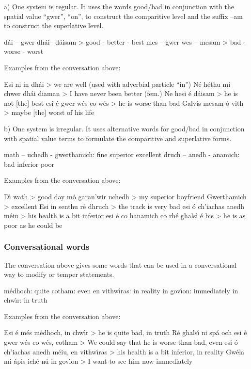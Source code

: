 a) One system is regular. It uses the words good/bad in conjunction with the spatial value “gwer”, “on”, to construct the comparitive level and the suffix –am to construct the superlative level.

        d\'{a}i – gwer dh\'{a}i– d\'{a}isam > good - better - best
        mes – gwer wes – mesam > bad - worse - worst

Examples from the conversation above:

Esi ni in dh\'{a}i > we are well (used with adverbial particle “in”)
N\'{e} h\'{e}thu mi chwer dh\'{a}i diaman > I have never been better (fem.)
Ne hesi \'{e} d\'{a}isam > he is not [the] best
esi \'{e} gwer w\'{e}s co w\'{e}s > he is worse than bad
Galvis mesam \'{o} vith > maybe [the] worst of his life

b) One system is irregular. It uses alternative words for good/bad in conjunction with spatial value terms to formulate the comparitive and superlative forms.

        math –  uchedh   -  gwerthamich: fine       superior     excellent
        druch – anedh -    anamich: bad       inferior    poor

Examples from the conversation above:

D\'{\i} wath > good day
m\'{o} garan’wir uchedh > my superior boyfriend
Gwerthamich > excellent
Esi in senthu r\'{e} dhruch > the track is very bad
esi \'{o} ch’iachas anedh m\'{e}iu > his health is a bit inferior
esi \'{e} co hanamich co rh\'{e} ghals\'{\i} \'{e} bis > he is as poor as he could be

\subsubsection{Conversational words}

The conversation above gives some words that can be used in a conversational way to modify or temper statements.

m\'{e}dhoch: quite
cotham: even
en vithw\'{\i}ras: in reality
in gov\'{\i}on: immediately
in chw\'{\i}r: in truth

Examples from the conversation above:

Esi \'{e} m\'{e}s m\'{e}dhoch, in chw\'{\i}r > he is quite bad, in truth
R\'{e} ghals\'{\i} ni sp\'{a} och esi \'{e} gwer w\'{e}s co w\'{e}s, cotham > We could say that he is worse than bad, even
esi \'{o} ch’iachas anedh m\'{e}iu, en vithw\'{\i}ras > his health is a bit inferior, in reality
Gw\'{e}la mi \'{a}pis ich\'{e} n\'{u} in gov\'{\i}on > I want to see him now immediately

